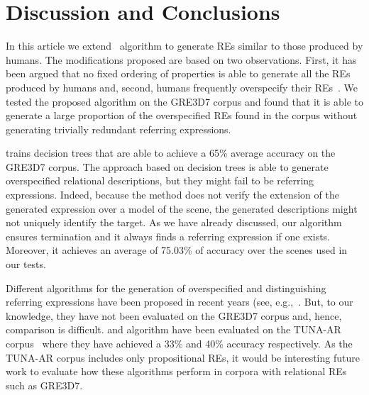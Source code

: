 \section{Discussion and Conclusions} \label{sec:discussion}

In this article we extend~ algorithm to generate REs similar to those produced by humans. The modifications 
proposed are based on two observations. First, it has been argued that no fixed ordering of properties is able to generate all the REs produced by humans and, second, humans frequently overspecify their REs~\cite{Engelhardt_Bailey_Ferreira_2006,Arts_Maes_Noordman_Jansen_2011,viet:gene11}. We tested 
the proposed algorithm on the GRE3D7 corpus and found that it is able to generate a large proportion of the overspecified REs found in the corpus without generating trivially redundant referring expressions.

 trains decision trees that are able to achieve a 65\% average accuracy on the GRE3D7 corpus. 
The approach based on decision trees is able to generate overspecified relational descriptions, but they might fail to be referring 
expressions. Indeed, because the  method does not verify the extension of the generated expression over a model of the scene, the 
generated descriptions might not uniquely identify the target.  As we have already discussed,
our algorithm ensures termination and it always finds a referring expression if one exists.  Moreover, it achieves an average of 75.03\% of accuracy over the scenes used in our tests. 

Different algorithms for the generation of overspecified and distinguishing referring expressions have been proposed in recent years 
(see, e.g.,~\cite{delucena-paraboni:2008:ENLG,ruud-emiel-mariet:2012:INLG2012}.  But, to our knowledge, they have not been evaluated on the 
GRE3D7 corpus and, hence, comparison is difficult.  and  algorithm
have been evaluated on the TUNA-AR corpus~\cite{gatt-balz-kow:2008:ENLG} where they have achieved a 33\% and 40\% accuracy respectively. 
As the TUNA-AR corpus includes only propositional REs, it would be interesting future work to evaluate how these algorithms perform in corpora with relational REs such as GRE3D7. 

